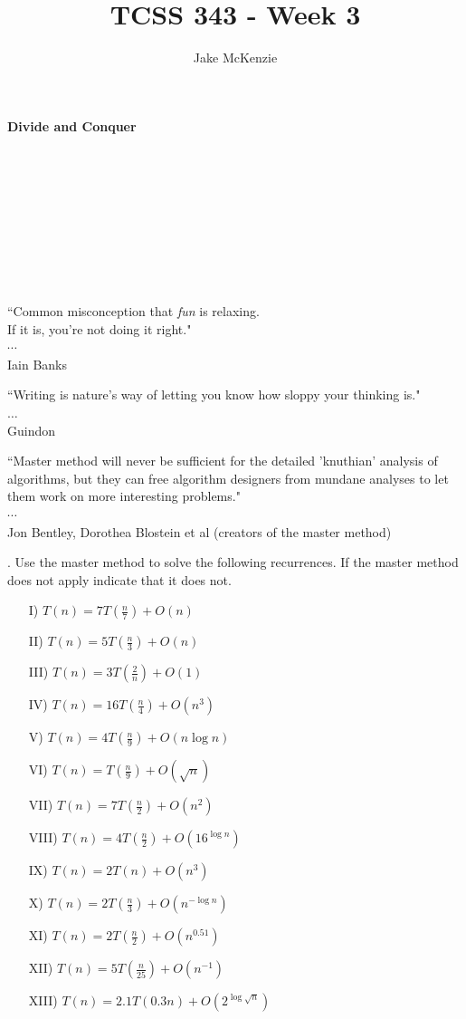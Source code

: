 \documentclass[12pt]{article}
\begin{document}
\title{TCSS 343 - Week 3}
\author{Jake McKenzie}
\maketitle
\noindent\centerline{\textbf{Divide and Conquer}}\\\\\\\\\\\\\\\\
\begin{center}
    ``Common misconception that \textit{fun} is relaxing. \\If it is, you’re not doing it right." \\$\cdots$\\ Iain Banks
\end{center}
\begin{center}
    ``Writing is nature's way of letting you know how sloppy your thinking is." \\
    $\dots$\\
    Guindon
\end{center}
\begin{center}
    ``Master method will never be sufficient for the detailed 'knuthian' analysis of algorithms, but they can free algorithm designers from mundane analyses to let them work on more interesting problems." \\$\cdots$\\ Jon Bentley, Dorothea Blostein et al (creators of the master method)  
\end{center}
. Use the master method to solve the following recurrences. If the master method does not apply indicate that it does not.
\begin{enumerate}
    \item[I)]$T(n) = 7T(\frac{n}{7}) + O(n)$
    \item[II)]$T(n) = 5T(\frac{n}{3}) + O(n)$
    \item[III)]$T(n) = 3T(\frac{2}{n}) + O(1)$
    \item[IV)]$T(n) = 16T(\frac{n}{4}) + O(n^3)$
    \item[V)]$T(n) = 4T(\frac{n}{9}) + O(n \log{n})$
    \item[VI)]$T(n) = T(\frac{n}{9}) + O(\sqrt{n})$
    \item[VII)]$T(n) = 7T(\frac{n}{2}) + O(n^2)$
    \item[VIII)]$T(n) = 4T(\frac{n}{2}) + O(16^{\log{n}})$
    \item[IX)]$T(n) = 2T(n) + O(n^3)$
    \item[X)]$T(n) = 2T(\frac{n}{3}) + O(n^{-\log{n}})$
    \item[XI)]$T(n) = 2T(\frac{n}{2}) + O(n^{0.51})$
    \item[XII)]$T(n) = 5T(\frac{n}{25}) + O(n^{-1})$
    \item[XIII)]$T(n) = 2.1T(0.3n) + O(2^{\log{\sqrt{n}}})$
\end{enumerate}
\end{document}
